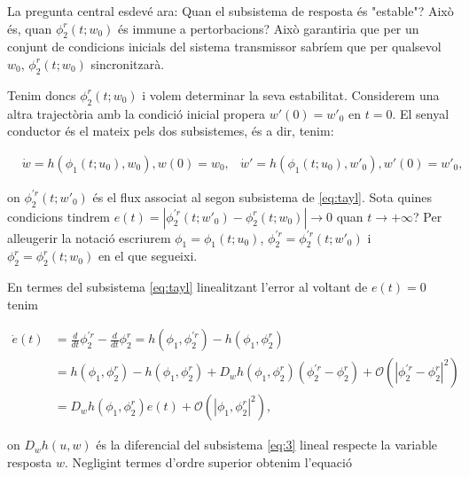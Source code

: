 \documentclass[11pt,a4paper,openright,oneside]{article}
\numberwithin{equation}{section}
\theoremstyle{definition}
\begin{document}
La pregunta central esdevé ara: Quan el subsistema de resposta és "estable"? Això és, quan $\phi_2^r(t; w_0)$ és immune a pertorbacions? Això garantiria que per un conjunt de condicions inicials del sistema transmissor sabríem que per qualsevol $w_0$, $\phi_2^r(t;w_0)$ sincronitzarà.

Tenim doncs $\phi_2^r(t;w_0)$ i volem determinar la seva estabilitat. Considerem una altra trajectòria amb la condició inicial propera $w'(0)=w'_0$ en $t=0$. El senyal conductor és el mateix pels dos subsistemes, és a dir, tenim: 

\begin{equation} \begin{aligned} \label{eq:tayl}
    &\dot{w} = h\left(\phi_1(t;u_0), w_0\right), w(0)=w_0,
    &\dot{w}' = h\left(\phi_1(t;u_0), w'_0\right), w'(0)=w'_0,
\end{aligned} \end{equation}

on $\phi_{2}^{\prime r}(t;w'_0)$ és el flux associat al segon subsistema de \eqref{eq:tayl}. Sota quines condicions tindrem $e(t)=|\phi_{2}^{\prime r}(t;w'_0)-\phi_{2}^{r}(t;w_0)| \rightarrow{0}$ quan $t\rightarrow{+\infty}$? Per alleugerir la notació escriurem $\phi_1=\phi_1(t;u_0)$, $\phi_2^{\prime r}=\phi_{2}^{\prime r}(t;w'_0)$ i $\phi_2^{r}=\phi_{2}^{r}(t;w_0)$ en el que segueixi.

En termes del subsistema \eqref{eq:tayl} linealitzant l'error al voltant de $e(t)=0$ tenim

\begin{equation} \begin{aligned} \label{eq:error_linealitzacio}
   \dot{e}(t) &= \frac{d}{dt}\phi_2^{\prime r} - \frac{d}{dt}\phi_2^r = h\left(\phi_1,\phi_2^{\prime r}\right) - h\left(\phi_1, \phi_2^r\right) \\
    &= h\left(\phi_1, \phi_2^r \right) - h\left(\phi_1, \phi_2^r \right) + D_wh\left(\phi_1, \phi_2^r\right)\left(\phi_{2}^{\prime r} -\phi_{2}^{r}\right) + \mathcal{O}\left(|\phi_2^{\prime r} - \phi_2^r|^2\right) \\
    &= D_w h\left(\phi_1, \phi_2^r\right)e\left(t\right) + \mathcal{O}\left(|\phi_1, \phi_2^r|^2\right),
\end{aligned} \end{equation}

on $D_{w}h\left(u,w\right)$ és la diferencial del subsistema \eqref{eq:3} lineal respecte la variable resposta $w$. Negligint termes d'ordre superior obtenim l'equació 
\end{document}
